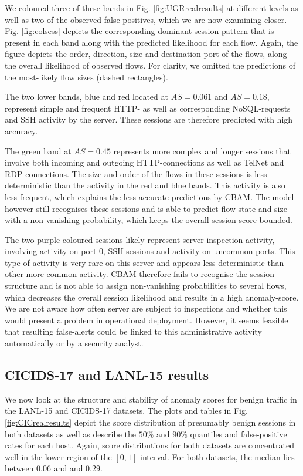 We coloured three of these bands in Fig. \ref{fig:UGRrealresults} at different levels as well as two of the observed false-positives, which we are now examining closer. Fig. \ref{fig:colsess} depicts the corresponding dominant session pattern that is present in each band along with the predicted likelihood for each flow. Again, the figure depicts the order, direction, size and destination port of the flows, along the overall likelihood of observed flows. For clarity, we omitted the predictions of the most-likely flow sizes (dashed rectangles).

The two lower bands, blue and red located at $AS=0.061$ and $AS=0.18$, represent simple and frequent HTTP- as well as corresponding NoSQL-requests and SSH activity by the server. These sessions are therefore predicted with high accuracy. 

The green band at $AS=0.45$ represents more complex and longer sessions that involve both incoming and outgoing HTTP-connections as well as TelNet and RDP connections. The size and order of the flows in these sessions is less deterministic than the activity in the red and blue bands. This activity is also less frequent, which explains the less accurate predictions by CBAM. The model however still recognises these sessions and is able to predict flow state and size with a non-vanishing probability, which keeps the overall session score bounded.

The two purple-coloured sessions likely represent server inspection activity, involving activity on port 0, SSH-sessions and activity on uncommon ports. This type of activity is very rare on this server and appears less deterministic than other more common activity. CBAM therefore fails to recognise the session structure and is not able to assign non-vanishing probabilities to several flows, which decreases the overall session likelihood and results in a high anomaly-score. We are not aware how often server are subject to inspections and whether this would present a problem in operational deployment. However, it seems feasible that resulting false-alerts could be linked to this administrative activity automatically or by a security analyst.

\subsection{CICIDS-17 and LANL-15 results}

We now look at the structure and stability of anomaly scores for benign traffic in the LANL-15 and CICIDS-17 datasets. 
The plots and tables in Fig. \ref{fig:CICrealresults} depict the score distribution of presumably benign sessions in both datasets as well as describe the $50\%$ and $90\%$ quantiles and false-positive rates for each host. Again, score distributions for both datasets are concentrated well in the lower region of the $[0,1]$ interval. For both datasets, the median lies between $0.06$ and and $0.29$.

